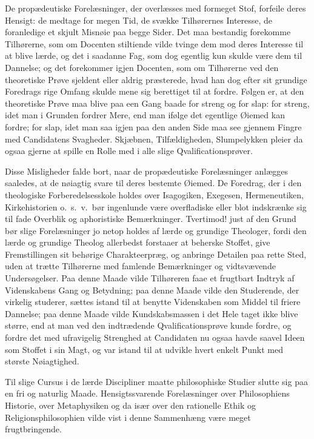 \documentclass[12pt,a4paper]{book}
\newcommand{\opage}[1]{\marginnote{\footnotesize\textit{[#1]}}}
\begin{document}
De propædeutiske Forelæsninger, der overlæsses med formeget Stof, forfeile
deres Hensigt: de medtage for megen Tid, de
\opage{161} svække Tilhørernes Interesse, de foranledige et skjult Misnøie paa begge
Sider. Det maa bestandig forekomme Tilhørerne, som om Docenten stiltiende
vilde tvinge dem mod deres Interesse til at blive lærde, og det i saadanne
Fag, som dog egentlig kun skulde være dem til Dannelse; og det forekommer
igjen Docenten, som om Tilhørerne ved den theoretiske Prøve sjeldent eller
aldrig præsterede, hvad han dog efter sit grundige Foredrags rige Omfang
skulde mene sig berettiget til at fordre. Følgen er, at den theoretiske Prøve
maa blive paa een Gang baade for streng og for slap: for streng, idet man i
Grunden fordrer Mere, end man ifølge det egentlige Øiemed kan fordre; for
slap, idet man saa igjen paa den anden Side maa see gjennem Fingre med
Candidatens Svagheder. Skjæbnen, Tilfældigheden, Slumpelykken pleier da ogsaa
gjerne at spille en Rolle med i alle slige Qvalificationsprøver.

Disse Misligheder falde bort, naar de propædeutiske Forelæsninger anlægges
saaledes, at de nøiagtig svare til deres bestemte Øiemed. De Foredrag, der i
den theologiske Forberedelsesskole holdes over Isagogiken, Exegesen,
Hermeneutiken, Kirkehistorien o.\ s.\ v.\ bør ingenlunde være overfladiske
eller blot indskrænke sig til fade Overblik og aphoristiske Bemærkninger.
Tvertimod! just af den Grund bør slige Forelæsninger jo netop holdes af lærde
og grundige Theologer, fordi den lærde og grundige Theolog allerbedst
forstaaer at beherske Stoffet, give Fremstillingen sit behørige
Charakteerpræg, og anbringe Detailen paa rette Sted, uden at trætte
Tilhørerne med famlende Bemærkninger og vidtsvævende Undersøgelser. Paa denne
Maade vilde Tilhøreren faae et frugtbart Indtryk af Videnskabens Gang og
Betydning; paa denne Maade vilde den Studerende, der virkelig studerer,
sættes istand til at benytte Videnskaben som Middel til friere Dannelse; paa
denne Maade vilde Kundskabsmassen i det Hele taget ikke blive større, end at
man ved den indtrædende
\opage{162} Qvalificationsprøve kunde fordre, og fordre det med ufravigelig Strenghed at
Candidaten nu ogsaa havde saavel Ideen som Stoffet i sin Magt, og var istand
til at udvikle hvert enkelt Punkt med største Nøiagtighed.

Til slige Cursus i de lærde Discipliner maatte philosophiske Studier slutte
sig paa en fri og naturlig Maade. Hensigtssvarende Forelæsninger over
Philosophiens Historie, over Metaphysiken og da især over den rationelle
Ethik og Religionsphilosophien vilde vist i denne Sammenhæng være meget
frugtbringende.
\end{document}
